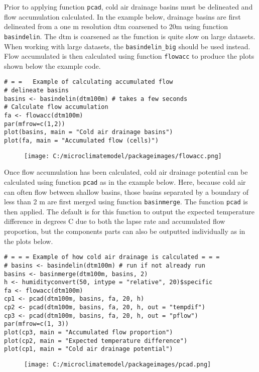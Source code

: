 \documentclass[]{article}
\begin{document}
Prior to applying function \texttt{pcad}, cold air drainage basins must
be delineated and flow accumulation calculated. In the example below,
drainage basins are first delineated from a one m resolution dtm
coarsened to 20m using function \texttt{basindelin}. The dtm is
coarsened as the function is quite slow on large datasets. When working
with large datasets, the \texttt{basindelin\_big} should be used
instead. Flow accumulated is then calculated using function
\texttt{flowacc} to produce the plots shown below the example code.

\begin{verbatim}
# = =   Example of calculating accumulated flow 
# delineate basins
basins <- basindelin(dtm100m) # takes a few seconds
# Calculate flow accumulation
fa <- flowacc(dtm100m)
par(mfrow=c(1,2))
plot(basins, main = "Cold air drainage basins")
plot(fa, main = "Accumulated flow (cells)")
\end{verbatim}

\begin{figure}
\centering
\texttt{[image: C:/microclimatemodel/packageimages/flowacc.png]}
\caption{}
\end{figure}

Once flow accumulation has been calculated, cold air drainage potential
can be calculated using function \texttt{pcad} as in the example below.
Here, because cold air can often flow between shallow basins, those
basins separated by a boundary of less than 2 m are first merged using
function \texttt{basinmerge}. The function \texttt{pcad} is then
applied. The default is for this function to output the expected
temperature difference in degrees C due to both the lapse rate and
accumulated flow proportion, but the components parts can also be
outputted individually as in the plots below.

\begin{verbatim}
# = = = Example of how cold air drainage is calculated = = =
# basins <- basindelin(dtm100m) # run if not already run
basins <- basinmerge(dtm100m, basins, 2)
h <- humidityconvert(50, intype = "relative", 20)$specific
fa <- flowacc(dtm100m)
cp1 <- pcad(dtm100m, basins, fa, 20, h)
cp2 <- pcad(dtm100m, basins, fa, 20, h, out = "tempdif")
cp3 <- pcad(dtm100m, basins, fa, 20, h, out = "pflow")
par(mfrow=c(1, 3))
plot(cp3, main = "Accumulated flow proportion")
plot(cp2, main = "Expected temperature difference")
plot(cp1, main = "Cold air drainage potential")
\end{verbatim}

\begin{figure}
\centering
\texttt{[image: C:/microclimatemodel/packageimages/pcad.png]}
\caption{}
\end{figure}
\end{document}
